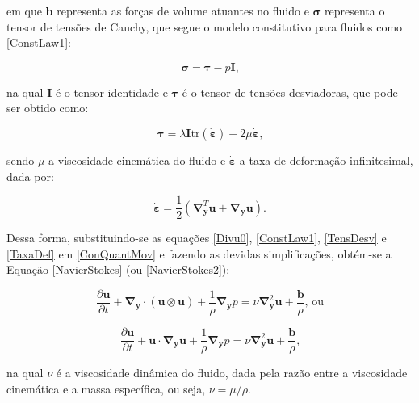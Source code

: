 \documentclass[_ArquivoPrincipal.tex]{subfiles}
\begin{document}
\noindent em que $\mathbf{b}$ representa as forças de volume atuantes no fluido e $\mathbf{\sigma}$ representa o tensor de tensões de Cauchy, que segue o modelo constitutivo para fluidos como \ref{ConstLaw1}:

\begin{equation}
    \mathbf{\sigma}=\mathbf{\tau}-p\mathbf{I}\text{,}
    \label{ConstLaw1}
\end{equation}

\noindent na qual $\mathbf{I}$ é o tensor identidade e $\mathbf{\tau}$ é o tensor de tensões desviadoras, que pode ser obtido como:

\begin{equation}
    \mathbf{\tau}=\lambda\mathbf{I}\textrm{tr}(\dot{\mathbf{\varepsilon}})+2\mu\dot{\mathbf{\varepsilon}}\text{,}
    \label{TensDesv}
\end{equation}

\noindent sendo $\mu$ a viscosidade cinemática do fluido e $\dot{\mathbf{\varepsilon}}$ a taxa de deformação infinitesimal, dada por:

\begin{equation}
    \dot{\mathbf{\varepsilon}}=\frac{1}{2}\left(\mathbf{\nabla}^T_\mathbf{y}\mathbf{u}+\mathbf{\nabla}_\mathbf{y}\mathbf{u}\right)\text{.}
    \label{TaxaDef}
\end{equation}

Dessa forma, substituindo-se as equações \ref{Divu0}, \ref{ConstLaw1}, \ref{TensDesv} e \ref{TaxaDef} em \ref{ConQuantMov} e fazendo as devidas simplificações, obtém-se a Equação \ref{NavierStokes} (ou \ref{NavierStokes2}):

\begin{equation}
    \frac{\partial\mathbf{u}}{\partial t}+\mathbf{\nabla}_\mathbf{y}\cdot(\mathbf{u}\otimes\mathbf{u})+\frac{1}{\rho}\mathbf{\nabla}_\mathbf{y}p=\nu\mathbf{\nabla}^2_\mathbf{y}\mathbf{u}+\frac{\mathbf{b}}{\rho}\text{, ou}
    \label{NavierStokes}
\end{equation}

\begin{equation}
    \frac{\partial\mathbf{u}}{\partial t}+\mathbf{u}\cdot\mathbf{\nabla}_\mathbf{y}\mathbf{u}+\frac{1}{\rho}\mathbf{\nabla}_\mathbf{y}p=\nu\mathbf{\nabla}^2_\mathbf{y}\mathbf{u}+\frac{\mathbf{b}}{\rho}\text{,}
    \label{NavierStokes2}
\end{equation}

\noindent na qual $\nu$ é a viscosidade dinâmica do fluido, dada pela razão entre a viscosidade cinemática e a massa específica, ou seja, $\nu=\mu/\rho$.
\end{document}

